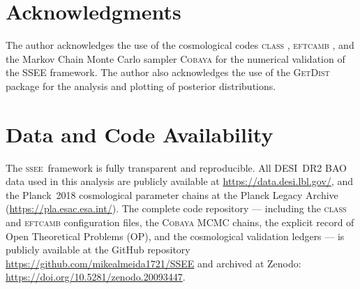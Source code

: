 \documentclass[12pt,a4paper]{article}
\newcommand{\SSEE}{\textsc{ssee}}
\begin{document}
\section*{Acknowledgments}
The author acknowledges the use of the cosmological codes \textsc{class} \citep{Blas2011}, \textsc{eftcamb} \citep{Hu2014}, and the Markov Chain Monte Carlo sampler \textsc{Cobaya} \citep{Torrado2021} for the numerical validation of the SSEE framework. The author also acknowledges the use of the \textsc{GetDist} package \citep{Lewis2019} for the analysis and plotting of posterior distributions.

\section*{Data and Code Availability}
The \SSEE\ framework is fully transparent and reproducible. All DESI~DR2 BAO data used in this analysis are publicly available at \url{https://data.desi.lbl.gov/}, and the Planck~2018 cosmological parameter chains at the Planck Legacy Archive (\url{https://pla.esac.esa.int/}). The complete code repository --- including the \textsc{class} and \textsc{eftcamb} configuration files, the \textsc{Cobaya} MCMC chains, the explicit record of Open Theoretical Problems (OP), and the cosmological validation ledgers --- is publicly available at the GitHub repository \url{https://github.com/mikealmeida1721/SSEE} and archived at Zenodo: \url{https://doi.org/10.5281/zenodo.20093447}.

\clearpage


\end{document}
